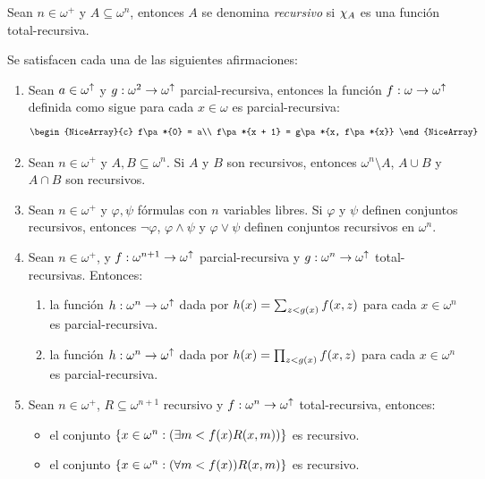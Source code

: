 \begin{definition}
	Sean $n\in\omega^{+}$ y $A\subseteq\omega^{n}$, entonces $A$ se denomina \emph{recursivo} si $\chi_{A}$ es una función total-recursiva.
\end{definition}

\begin{theorem}
	Se satisfacen cada una de las siguientes afirmaciones:

	\begin{enumerate}
		\item Sean $a\in\omega^{\uparrow}$ y $g:\omega^{2}\to\omega^{\uparrow}$ parcial-recursiva, entonces la función $f:\omega\to\omega^{\uparrow}$ definida como sigue para cada $x\in\omega$ es parcial-recursiva:
		\[
			\begin{NiceArray}{c}
				f\pa*{0} = a\\
				f\pa*{x + 1} = g\pa*{x, f\pa*{x}}
			\end{NiceArray}
		\]
		\item Sean $n\in\omega^{+}$ y $A, B\subseteq\omega^{n}$. Si $A$ y $B$ son recursivos, entonces $\omega^{n}\setminus A$, $A\cup B$ y $A\cap B$ son recursivos.
		\item Sean $n\in\omega^{+}$ y $\varphi,\psi$ fórmulas con $n$ variables libres. Si $\varphi$ y $\psi$ definen conjuntos recursivos, entonces $\neg\varphi$, $\varphi\land\psi$ y $\varphi\vee\psi$ definen conjuntos  recursivos en $\omega^{n}$.
		\item Sean $n\in\omega^{+}$, y $f:\omega^{n + 1}\to\omega^{\uparrow}$ parcial-recursiva y $g:\omega^{n}\to\omega^{\uparrow}$ total-recursivas. Entonces:

		\begin{enumerate}
			\item la función $h:\omega^{n}\to\omega^{\uparrow}$ dada por $h\pa*{x} =\sum_{z < g\pa*{x}}f\pa*{x, z}$ para cada $x\in\omega^{n}$ es parcial-recursiva.
			\item la función $h:\omega^{n}\to\omega^{\uparrow}$ dada por $h\pa*{x} =\prod_{z < g\pa*{x}}f\pa*{x, z}$ para cada $x\in\omega^{n}$ es parcial-recursiva.
		\end{enumerate}

		\item Sean $n\in\omega^{+}$, $R\subseteq\omega^{n + 1}$ recursivo y $f:\omega^{n}\to\omega^{\uparrow}$ total-recursiva, entonces:

		\begin{itemize}
			\item el conjunto $\set{x\in\omega^{n}:\pa*{\exists m < f\pa*{x}R\pa*{x, m}}}$ es recursivo.
			\item el conjunto $\set{x\in\omega^{n}:\pa*{\forall m < f\pa*{x}}R\pa*{x, m}}$ es recursivo.
		\end{itemize}


\end{enumerate}
\end{theorem}
